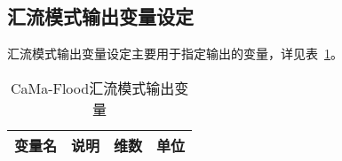 \subsection{汇流模式输出变量设定}
汇流模式输出变量设定主要用于指定输出的变量，详见表~\ref{CaMa-Flood汇流模式输出变量}。
\begin{table}[htbp]
\centering \renewcommand{\arraystretch}{1.5}
\caption{CaMa-Flood汇流模式输出变量}
\label{CaMa-Flood汇流模式输出变量}
\begin{tabular}{lp{}ll}
\toprule
\textbf{变量名} & \textbf{说明} & \textbf{维数} & \textbf{单位} \\ \midrule


\end{tabular}
\end{table}
